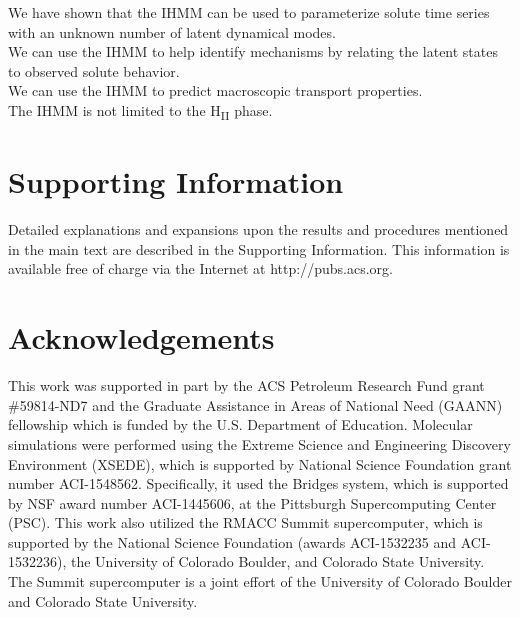 \documentclass{article}
\begin{document}
  \noindent We have shown that the IHMM can be used to parameterize solute time series
  with an unknown number of latent dynamical modes. \\
  
  \noindent We can use the IHMM to help identify mechanisms by relating the latent
  states to observed solute behavior. \\
  
  \noindent We can use the IHMM to predict macroscopic transport properties. \\
  
  \noindent The IHMM is not limited to the H\textsubscript{II} phase.
  
  \section*{Supporting Information}

  Detailed explanations and expansions upon the results and procedures mentioned in
  the main text are described in the Supporting Information. This information is
  available free of charge via the Internet at http://pubs.acs.org.

  \section*{Acknowledgements}

  This work was supported in part by the ACS Petroleum Research Fund
  grant \#59814-ND7 and the Graduate Assistance in Areas of National Need (GAANN) 
  fellowship which is funded by the U.S. Department of Education. 
  Molecular simulations were performed using the Extreme Science and
  Engineering Discovery Environment (XSEDE), which is supported by National
  Science Foundation grant number ACI-1548562. Specifically, it used the Bridges
  system, which is supported by NSF award number ACI-1445606, at the Pittsburgh
  Supercomputing Center (PSC). This work also utilized the RMACC Summit supercomputer,
  which is supported by the National Science Foundation (awards ACI-1532235 and
  ACI-1532236), the University of Colorado Boulder, and Colorado State
  University. The Summit supercomputer is a joint effort of the University of
  Colorado Boulder and Colorado State University.

  \clearpage

  
  


\end{document}
